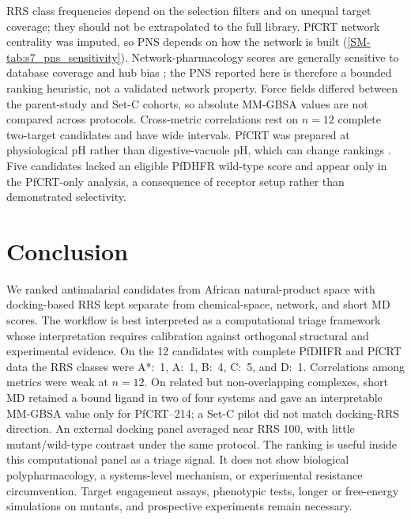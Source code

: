 \documentclass[journal=jcisd8,manuscript=article,layout=traditional]{achemso}
\begin{document}
RRS class frequencies depend on the selection filters and on unequal target coverage; they should not be extrapolated to the full library. PfCRT network centrality was imputed, so PNS depends on how the network is built (\cref{SM-tab:s7_pns_sensitivity}). Network-pharmacology scores are generally sensitive to database coverage and hub bias \citep{panossian2025pitfalls}; the PNS reported here is therefore a bounded ranking heuristic, not a validated network property. Force fields differed between the parent-study and Set-C cohorts, so absolute MM-GBSA values are not compared across protocols. Cross-metric correlations rest on $n=12$ complete two-target candidates and have wide intervals. PfCRT was prepared at physiological pH rather than digestive-vacuole pH, which can change rankings \citep{temgoua2026antimalarial}. Five candidates lacked an eligible PfDHFR wild-type score and appear only in the PfCRT-only analysis, a consequence of receptor setup rather than demonstrated selectivity.


\section{Conclusion}

We ranked antimalarial candidates from African natural-product space with docking-based RRS kept separate from chemical-space, network, and short MD scores. The workflow is best interpreted as a computational triage framework whose interpretation requires calibration against orthogonal structural and experimental evidence. On the 12 candidates with complete PfDHFR and PfCRT data the RRS classes were A*:~\num{1}, A:~\num{1}, B:~\num{4}, C:~\num{5}, and D:~\num{1}. Correlations among metrics were weak at $n=\num{12}$. On related but non-overlapping complexes, short MD retained a bound ligand in two of four systems and gave an interpretable MM-GBSA value only for PfCRT--214; a Set-C pilot did not match docking-RRS direction. An external docking panel averaged near RRS \num{100}, with little mutant/wild-type contrast under the same protocol. The ranking is useful inside this computational panel as a triage signal. It does not show biological polypharmacology, a systems-level mechanism, or experimental resistance circumvention. Target engagement assays, phenotypic tests, longer or free-energy simulations on mutants, and prospective experiments remain necessary.
\end{document}
